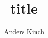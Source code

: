 \documentclass[12pt, twoside,a4paper]{article}
\title{title}
\author{Anders Kinch}
\date {}
\begin{document}
\maketitle


\medskip

\nocite{*}

%

\end{document}
